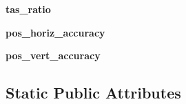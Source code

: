 \begin{DoxyCompactItemize}
{\bfseries tas\+\_\+ratio}
\item 
\mbox{\label{classpymavlink_1_1dialects_1_1v10_1_1MAVLink__estimator__status__message_afabe50f223613e0a8e3719bdb3a0800d}} 
{\bfseries pos\+\_\+horiz\+\_\+accuracy}
\item 
\mbox{\label{classpymavlink_1_1dialects_1_1v10_1_1MAVLink__estimator__status__message_aebc3b173622e61ddf83fa98b8c796e78}} 
{\bfseries pos\+\_\+vert\+\_\+accuracy}
\end{DoxyCompactItemize}
\subsection*{Static Public Attributes}
